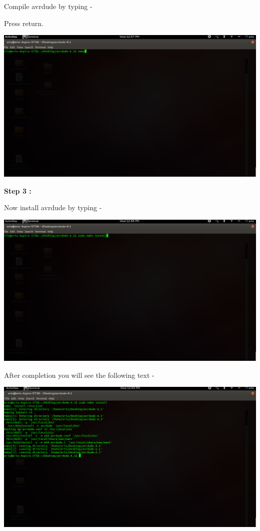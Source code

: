 \begin{flushleft}
Compile avrdude by typing - 
\medskip

\medskip

Press return.

\medskip

\includegraphics[scale=0.3]{f20}


\medskip

\textbf{Step 3 :}
 
Now install avrdude by typing - 

\medskip


\medskip

\includegraphics[scale=0.3]{f21}

\medskip

After completion you will see the following text - 

\medskip

\includegraphics[scale=0.3]{f22}


\end{flushleft}
